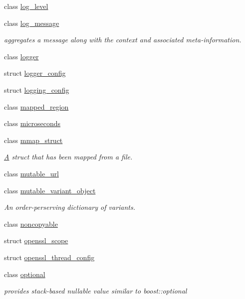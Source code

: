 \begin{DoxyCompactItemize}
class \mbox{\hyperlink{classfc_1_1log__level}{log\+\_\+level}}
\item 
class \mbox{\hyperlink{classfc_1_1log__message}{log\+\_\+message}}
\begin{DoxyCompactList}\small\item\em aggregates a message along with the context and associated meta-\/information. \end{DoxyCompactList}\item 
class \mbox{\hyperlink{classfc_1_1logger}{logger}}
\item 
struct \mbox{\hyperlink{structfc_1_1logger__config}{logger\+\_\+config}}
\item 
struct \mbox{\hyperlink{structfc_1_1logging__config}{logging\+\_\+config}}
\item 
class \mbox{\hyperlink{classfc_1_1mapped__region}{mapped\+\_\+region}}
\item 
class \mbox{\hyperlink{classfc_1_1microseconds}{microseconds}}
\item 
class \mbox{\hyperlink{classfc_1_1mmap__struct}{mmap\+\_\+struct}}
\begin{DoxyCompactList}\small\item\em \mbox{\hyperlink{struct_a}{A}} struct that has been mapped from a file. \end{DoxyCompactList}\item 
class \mbox{\hyperlink{classfc_1_1mutable__url}{mutable\+\_\+url}}
\item 
class \mbox{\hyperlink{classfc_1_1mutable__variant__object}{mutable\+\_\+variant\+\_\+object}}
\begin{DoxyCompactList}\small\item\em An order-\/perserving dictionary of variant\textquotesingle{}s. \end{DoxyCompactList}\item 
class \mbox{\hyperlink{classfc_1_1noncopyable}{noncopyable}}
\item 
struct \mbox{\hyperlink{structfc_1_1openssl__scope}{openssl\+\_\+scope}}
\item 
struct \mbox{\hyperlink{structfc_1_1openssl__thread__config}{openssl\+\_\+thread\+\_\+config}}
\item 
class \mbox{\hyperlink{classfc_1_1optional}{optional}}
\begin{DoxyCompactList}\small\item\em provides stack-\/based nullable value similar to boost\+::optional \end{DoxyCompactList}\item 

\end{DoxyCompactItemize}
